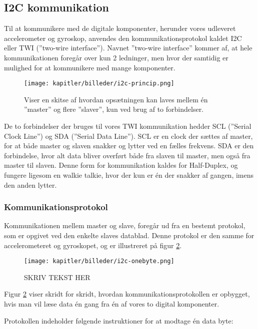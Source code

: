 \newpage
\subsection{I2C kommunikation}
Til at kommunikere med de digitale komponenter, herunder vores udleveret accelerometer og gyroskop, anvendes den kommunikationsprotokol kaldet I2C eller TWI (”two-wire interface”). Navnet ”two-wire interface” kommer af, at hele kommunikationen foregår over kun 2 ledninger, men hvor der samtidig er mulighed for at kommunikere med mange komponenter.

\begin{figure}[ht]
    \centering
    \texttt{[image: kapitler/billeder/i2c-princip.png]}
    \caption{Viser en skitse af hvordan opsætningen kan laves mellem
én ”master” og flere ”slaver”, kun ved brug af to forbindelser.}
    \label{fig:i2cprincip}
\end{figure}

De to forbindelser der bruges til vores TWI kommunikation hedder SCL (”Serial Clock Line”) og SDA (”Serial Data Line”). SCL er en clock der sættes af master, for at både master og slaven snakker og lytter ved en fælles frekvens. SDA er den forbindelse, hvor alt data bliver overført både fra slaven til master, men også fra master til slaven. Denne form for kommunikation kaldes for Half-Duplex, og fungere ligesom en walkie talkie, hvor der kun er én der snakker af gangen, imens den anden lytter.

\subsubsection{Kommunikationsprotokol}

Kommunikationen mellem master og slave, foregår ud fra en bestemt protokol, som er opgivet ved den enkelte slaves datablad. Denne protokol er den samme for accelerometeret og gyroskopet, og er illustreret på figur \ref{fig:i2conebyte}. 

\begin{figure}[ht]
    \centering
    \texttt{[image: kapitler/billeder/i2c-onebyte.png]}
    \caption{SKRIV TEKST HER}
    \label{fig:i2conebyte}
\end{figure}

Figur \ref{fig:i2conebyte} viser skridt for skridt, hvordan kommunikationsprotokollen er opbygget, hvis man vil læse data én gang fra én af vores to digital komponenter.

Protokollen indeholder følgende instruktioner for at modtage én data byte:

